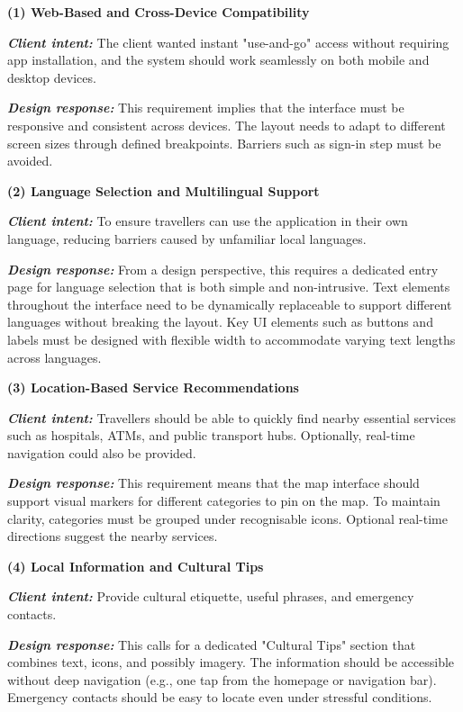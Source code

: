 \textbf{(1) Web-Based and Cross-Device Compatibility}

\textit{\textbf{Client intent:}} The client wanted instant "use-and-go" access without requiring app installation, and the system should work seamlessly on both mobile and desktop devices.

\textit{\textbf{Design response:}} This requirement implies that the interface must be responsive and consistent across devices. The layout needs to adapt to different screen sizes through defined breakpoints. Barriers such as sign-in step must be avoided. 

\textbf{(2) Language Selection and Multilingual Support}

\textit{\textbf{Client intent:}} To ensure travellers can use the application in their own language, reducing barriers caused by unfamiliar local languages.  

\textit{\textbf{Design response:}} From a design perspective, this requires a dedicated entry page for language selection that is both simple and non-intrusive. Text elements throughout the interface need to be dynamically replaceable to support different languages without breaking the layout. Key UI elements such as buttons and labels must be designed with flexible width to accommodate varying text lengths across languages.

\textbf{(3) Location-Based Service Recommendations}

\textit{\textbf{Client intent:}} Travellers should be able to quickly find nearby essential services such as hospitals, ATMs, and public transport hubs. Optionally, real-time navigation could also be provided.  

\textit{\textbf{Design response:}} This requirement means that the map interface should support visual markers for different categories to pin on the map. To maintain clarity, categories must be grouped under recognisable icons. Optional real-time directions suggest the nearby services.

\textbf{(4) Local Information and Cultural Tips}

\textit{\textbf{Client intent:}} Provide cultural etiquette, useful phrases, and emergency contacts.

\textit{\textbf{Design response:}} This calls for a dedicated "Cultural Tips" section that combines text, icons, and possibly imagery. The information should be accessible without deep navigation (e.g., one tap from the homepage or navigation bar). Emergency contacts should be easy to locate even under stressful conditions.


